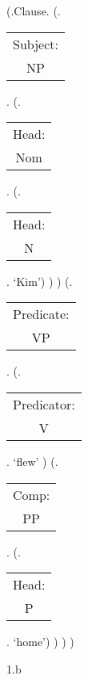 \documentclass[12pt,letterpaper]{article}
\begin{document}
		\begin{figure}
	\begin{center}
		\begin{parsetree}
			(.Clause.
			(.\begin{tabular}{c}Subject:\\NP\end{tabular}.  
			(.\begin{tabular}{c}Head:\\Nom\end{tabular}.
			(.\begin{tabular}{c}Head:\\N\end{tabular}. `Kim')
			)
			)
			(.\begin{tabular}{c}Predicate:\\VP\end{tabular}.
			(.\begin{tabular}{c}Predicator:\\V\end{tabular}.    `flew' )
			(.\begin{tabular}{c}Comp:\\PP\end{tabular}. 
			(.\begin{tabular}{c}Head:\\P\end{tabular}. `home')
			)
			)
			)
			
		\end{parsetree}
		\hfill \break \hfill \break
		1.b
	\end{center}
\end{figure}	
\end{document}
